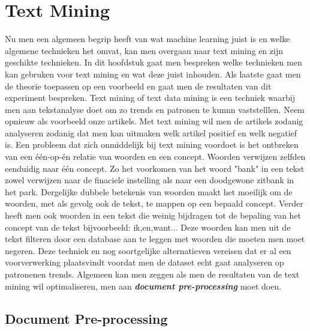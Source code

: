 \chapter{Text Mining}\label{Text Mining}

Nu men een algemeen begrip heeft van wat machine learning juist is en welke algemene technieken het omvat, kan men overgaan naar text mining en zijn geschikte technieken. In dit hoofdstuk gaat men bespreken welke technieken men kan gebruken voor text mining en wat deze juist inhouden. Als laatste gaat men de theorie toepassen op een voorbeeld en gaat men de resultaten van dit experiment bespreken. 
\newline
%
Text mining of text data mining is een techniek waarbij men aan tekstanalyse doet om zo trends en patronen te kunnn vaststelllen. Neem opnieuw als voorbeeld onze artikels. Met text mining wil men de artikels zodanig analyseren zodanig dat men kan uitmaken welk artikel positief en welk negatief is.
Een probleem dat zich onmiddelijk bij text mining voordoet is het ontbreken van een  \'e\'en-op-\'en relatie van woorden en een concept. Woorden verwijzen zelfden eenduidig naar één concept. Zo het voorkomen van het woord "bank" in een tekst zowel verwijzen naar de finaciele instelling als naar een doodgewone zitbank in het park. Dergelijke dubbele betekenis van woorden maakt het moeilijk om de woorden, met als gevolg ook de tekst, te mappen op een bepaald concept.
%
Verder heeft men ook woorden in een tekst die weinig bijdragen tot de bepaling van het concept van de tekst bijvoorbeeld: ik,en,want...
Deze woorden kan men uit de tekst filteren door een database aan te leggen met woorden die moeten men moet negeren. Deze techniek en nog soortgelijke alternatieven vereisen dat er al een voorverwerking plaatsvindt voordat men de dataset echt gaat analyseren op patronenen trends. Algemeen kan men zeggen als men de resultaten van de text mining wil optimaliseren, men aan \textbf{\textit{document pre-processing}} moet doen.

\section{Document Pre-processing }\label{Document Pre-processing}

